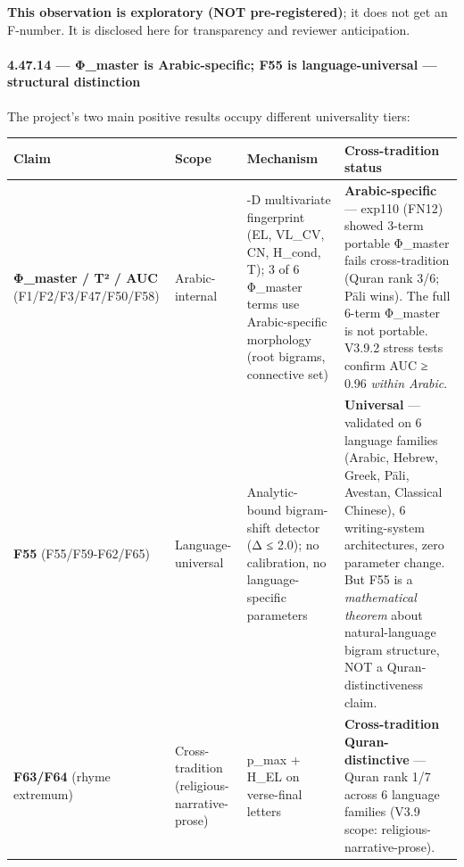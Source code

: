 \documentclass[
]{article}
\newcounter{none} %
\begin{document}
\textbf{This observation is exploratory (NOT pre-registered)}; it does
not get an F-number. It is disclosed here for transparency and reviewer
anticipation.

\paragraph{4.47.14 --- Φ\_master is Arabic-specific; F55 is
language-universal --- structural
distinction}\label{ux3c6_master-is-arabic-specific-f55-is-language-universal-structural-distinction}

The project's two main positive results occupy different universality
tiers:

{\def\LTcaptype{none} %
\begin{longtable}[]{@{}
  >{\raggedright\arraybackslash}p{}
  >{\raggedright\arraybackslash}p{}
  >{\raggedright\arraybackslash}p{}
  >{\raggedright\arraybackslash}p{}@{}}
\toprule\noalign{}
\begin{minipage}[b]{\linewidth}\raggedright
Claim
\end{minipage} & \begin{minipage}[b]{\linewidth}\raggedright
Scope
\end{minipage} & \begin{minipage}[b]{\linewidth}\raggedright
Mechanism
\end{minipage} & \begin{minipage}[b]{\linewidth}\raggedright
Cross-tradition status
\end{minipage} \\
\midrule\noalign{}
\endhead
\bottomrule\noalign{}
\endlastfoot
\textbf{Φ\_master / T² / AUC} (F1/F2/F3/F47/F50/F58) & Arabic-internal &
5-D multivariate fingerprint (EL, VL\_CV, CN, H\_cond, T); 3 of 6
Φ\_master terms use Arabic-specific morphology (root bigrams, connective
set) & \textbf{Arabic-specific} --- exp110 (FN12) showed 3-term portable
Φ\_master fails cross-tradition (Quran rank 3/6; Pāli wins). The full
6-term Φ\_master is not portable. V3.9.2 stress tests confirm AUC ≥ 0.96
\emph{within Arabic}. \\
\textbf{F55} (F55/F59-F62/F65) & Language-universal & Analytic-bound
bigram-shift detector (Δ ≤ 2.0); no calibration, no language-specific
parameters & \textbf{Universal} --- validated on 6 language families
(Arabic, Hebrew, Greek, Pāli, Avestan, Classical Chinese), 6
writing-system architectures, zero parameter change. But F55 is a
\emph{mathematical theorem} about natural-language bigram structure, NOT
a Quran-distinctiveness claim. \\
\textbf{F63/F64} (rhyme extremum) & Cross-tradition
(religious-narrative-prose) & p\_max + H\_EL on verse-final letters &
\textbf{Cross-tradition Quran-distinctive} --- Quran rank 1/7 across 6
language families (V3.9 scope: religious-narrative-prose). \\
\end{longtable}
}
\end{document}

